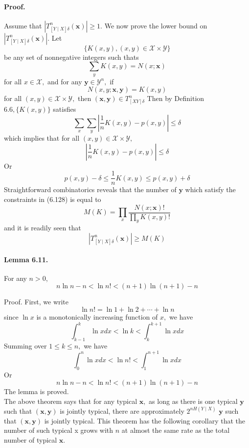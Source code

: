 \documentclass[8pt]{article}
\begin{document}
\paragraph{Proof.}
Assume that $\left|T_{[Y \mid X] \delta}^{n}(\mathbf{x})\right| \geq 1 .$ We now prove the lower bound on $\left|T_{[Y \mid X] \delta}^{n}(\mathbf{x})\right|$. Let
$$
\{K(x, y),(x, y) \in \mathcal{X} \times \mathcal{Y}\}
$$
be any set of nonnegative integers such thats
$$
\sum_{y} K(x, y)=N(x ; \mathbf{x})
$$
for all $x \in \mathcal{X},$ and for any $\mathbf{y} \in \mathcal{Y}^{n},$ if
$$
N(x, y ; \mathbf{x}, \mathbf{y})=K(x, y)
$$
for all $(x, y) \in \mathcal{X} \times \mathcal{Y},$ then $(\mathbf{x}, \mathbf{y}) \in T_{[X Y] \delta}^{n}$
Then by Definition $6.6,\{K(x, y)\}$ satisfies
$$
\sum_{x} \sum_{y}\left|\frac{1}{n} K(x, y)-p(x, y)\right| \leq \delta
$$
which implies that for all $(x, y) \in \mathcal{X} \times \mathcal{Y},$
$$
\left|\frac{1}{n} K(x, y)-p(x, y)\right| \leq \delta
$$
Or
$$
p(x, y)-\delta \leq \frac{1}{n} K(x, y) \leq p(x, y)+\delta
$$
Straightforward combinatorics reveals that the number of $\mathbf{y}$ which satisfy the constraints in (6.128) is equal to
$$
M(K)=\prod_{x} \frac{N(x ; \mathbf{x}) !}{\prod_{y} K(x, y) !}
$$
and it is readily seen that
$$
\left|T_{[Y \mid X] \delta}^{n}(\mathbf{x})\right| \geq M(K)
$$


\begin{tcolorbox}
\paragraph{Lemma 6.11.} For any $n>0$,
$$
n \ln n-n<\ln n !<(n+1) \ln (n+1)-n
$$
\end{tcolorbox}
Proof. First, we write
$$
\ln n !=\ln 1+\ln 2+\cdots+\ln n
$$
since $\ln x$ is a monotonically increasing function of $x,$ we have
$$
\int_{k-1}^{k} \ln x d x<\ln k<\int_{k}^{k+1} \ln x d x
$$
Summing over $1 \leq k \leq n,$ we have
$$
\int_{0}^{n} \ln x d x<\ln n !<\int_{1}^{n+1} \ln x d x
$$
Or
$$
n \ln n-n<\ln n !<(n+1) \ln (n+1)-n
$$
The lemma is proved.\\

The above theorem says that for any typical $\mathbf{x},$ as long as there is one typical $\mathbf{y}$ such that $(\mathbf{x}, \mathbf{y})$ is jointly typical, there are approximately $2^{n H(Y \mid X)}$ $\mathbf{y}$ such that $(\mathbf{x}, \mathbf{y})$ is jointly typical. This theorem has the following corollary that the number of such typical x grows with $n$ at almost the same rate as the total number of typical $\mathbf{x}$.
\end{document}
